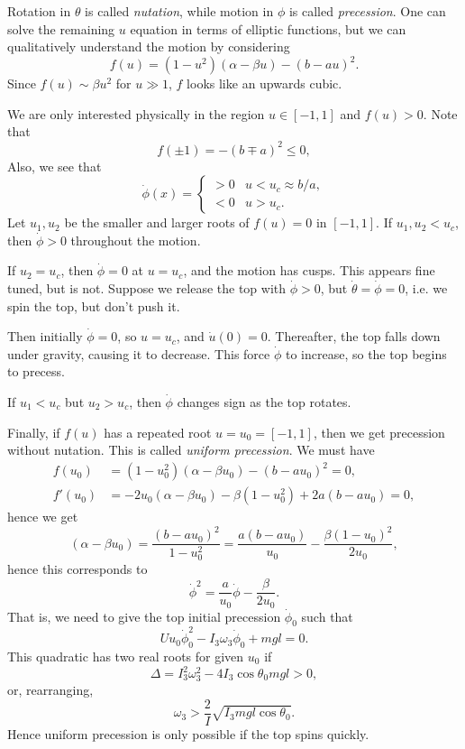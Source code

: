 \documentclass[12pt]{article}
\begin{document}

Rotation in $\theta$ is called \emph{nutation}, while motion in $\phi$ is called \emph{precession}. One can solve the remaining $u$ equation in terms of elliptic functions, but we can qualitatively understand the motion by considering
\[
f(u) = (1 - u^2)(\alpha - \beta u) - (b - a u)^2.
\]
Since $f(u) \sim \beta u^2$ for $u \gg 1$, $f$ looks like an upwards cubic.

We are only interested physically in the region $u \in [-1, 1]$ and $f(u) > 0$. Note that
\[
f(\pm 1) = -(b \mp a)^2 \leq 0,
\]
Also, we see that
\[
\dot\phi(x) =
\begin{cases}
	> 0 & u < u_c \approx b/a,\\
	< 0 & u > u_c.
\end{cases}
\]
Let $u_1, u_2$ be the smaller and larger roots of $f(u) = 0$ in $[-1,1]$. If $u_1, u_2 < u_c$, then $\dot \phi > 0$ throughout the motion.

If $u_2 = u_c$, then $\dot \phi = 0$ at $u = u_c$, and the motion has cusps. This appears fine tuned, but is not. Suppose we release the top with $\dot \phi > 0$, but $\dot \theta = \dot \phi = 0$, i.e. we spin the top, but don't push it.

Then initially $\dot \phi = 0$, so $u = u_c$, and $\dot u(0) = 0$. Thereafter, the top falls down under gravity, causing it to decrease. This force $\dot \phi$ to increase, so the top begins to precess.

If $u_1 < u_c$ but $u_2 > u_c$, then $\dot \phi$ changes sign as the top rotates.

Finally, if $f(u)$ has a repeated root $u = u_0 = [-1, 1]$, then we get precession without nutation. This is called \emph{uniform precession}. We must have
\begin{align*}
	f(u_0) &= (1 - u_0^2)(\alpha - \beta u_0) - (b - a u_0)^2 = 0,\\
	f'(u_0) &= - 2u_0 (\alpha - \beta u_0) - \beta(1 - u_0^2) + 2 a(b - a u_0) = 0,
\end{align*}
hence we get
\[
	(\alpha - \beta u_0) = \frac{(b - au_0)^2}{1 - u_0^2} = \frac{a(b - a u_0)}{u_0} - \frac{\beta(1 - u_0)^2}{2 u_0},
\]
hence this corresponds to
\[
\dot \phi^2 = \frac{a}{u_0} \dot \phi - \frac{\beta}{2u_0}.
\]
That is, we need to give the top initial precession $\dot \phi_0$ such that
\[
U u_0 \dot \phi_0^2 - I_3 \omega_3 \dot \phi_0 + mgl = 0.
\]
This quadratic has two real roots for given $u_0$ if
\[
\Delta = I_3^2 \omega_3^2 - 4 I_3 \cos \theta_0 mgl > 0,
\]
or, rearranging,
\[
	\omega_3 > \frac{2}{I} \sqrt{I_3 mgl \cos \theta_0}.
\]
Hence uniform precession is only possible if the top spins quickly.
\end{document}
